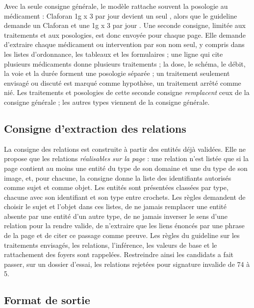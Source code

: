 Avec la seule consigne générale, le modèle rattache souvent la posologie au médicament : \og Claforan 1g x 3 par jour \fg{} devient un seul , alors que le guideline demande un  \og Claforan \fg{} et une  \og 1g x 3 par jour \fg{}. Une seconde consigne, limitée aux traitements et aux posologies, est donc envoyée pour chaque page. Elle demande d'extraire chaque médicament ou intervention par son nom seul, y compris dans les listes d'ordonnance, les tableaux et les formulaires ; une ligne qui cite plusieurs médicaments donne plusieurs traitements ; la dose, le schéma, le débit, la voie et la durée forment une posologie séparée ; un traitement seulement envisagé ou discuté est marqué comme hypothèse, un traitement arrêté comme nié. Les traitements et posologies de cette seconde consigne \emph{remplacent} ceux de la consigne générale ; les autres types viennent de la consigne générale.

\subsection{Consigne d'extraction des relations}\label{sec:c4-contraintes-relations}

La consigne des relations est construite à partir des entités déjà validées. Elle ne propose que les relations \emph{réalisables sur la page} : une relation n'est listée que si la page contient au moins une entité du type de son domaine et une du type de son image, et, pour chacune, la consigne donne la liste des identifiants autorisés comme sujet et comme objet. Les entités sont présentées classées par type, chacune avec son identifiant et son type entre crochets. Les règles demandent de choisir le sujet et l'objet dans ces listes, de ne jamais remplacer une entité absente par une entité d'un autre type, de ne jamais inverser le sens d'une relation pour la rendre valide, de n'extraire que les liens énoncés par une phrase de la page et de citer ce passage comme preuve. Les règles du guideline sur les traitements envisagés, les relations, l'inférence, les valeurs de base et le rattachement des foyers sont rappelées. Restreindre ainsi les candidats a fait passer, sur un dossier d'essai, les relations rejetées pour signature invalide de 74 à 5.

\subsection{Format de sortie}\label{sec:c4-json}

